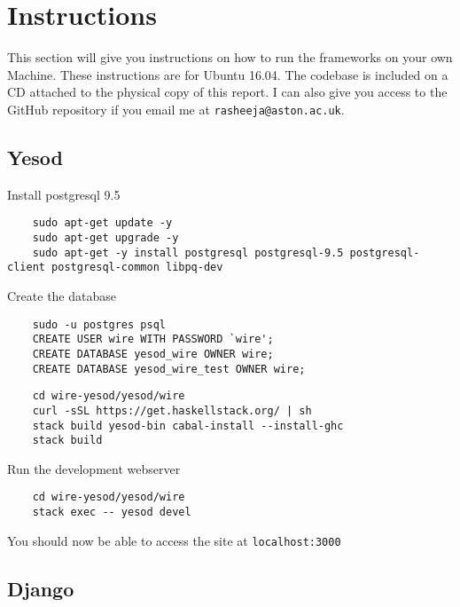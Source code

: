 \chapter{Instructions}

This section will give you instructions on how to run the frameworks on your own Machine.
These instructions are for Ubuntu 16.04. The codebase is included on a CD attached to the
physical copy of this report. I can also give you access to the GitHub repository if you
email me at \texttt{rasheeja@aston.ac.uk}.

\section{Yesod}

Install postgresql 9.5
\lstset{language=Bash}
\begin{lstlisting}
    sudo apt-get update -y
    sudo apt-get upgrade -y
    sudo apt-get -y install postgresql postgresql-9.5 postgresql-client postgresql-common libpq-dev
\end{lstlisting}
Create the database
\begin{lstlisting}
    sudo -u postgres psql
    CREATE USER wire WITH PASSWORD `wire';
    CREATE DATABASE yesod_wire OWNER wire;
    CREATE DATABASE yesod_wire_test OWNER wire;
\end{lstlisting}
\begin{lstlisting}
    cd wire-yesod/yesod/wire
    curl -sSL https://get.haskellstack.org/ | sh
    stack build yesod-bin cabal-install --install-ghc
    stack build
\end{lstlisting}
Run the development webserver
\begin{lstlisting}
    cd wire-yesod/yesod/wire
    stack exec -- yesod devel
\end{lstlisting}
You should now be able to access the site at \texttt{localhost:3000}

\section{Django}

